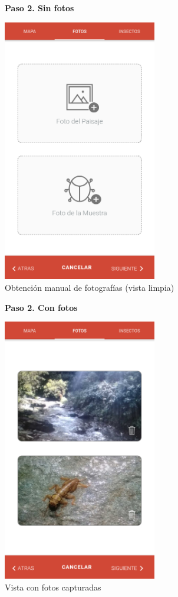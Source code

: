 				\begin{figure}[H]
					\centering
					\textbf{Paso 2. Sin fotos}\par\medskip
					\includegraphics[width=0.6\textwidth]{Screenshots/registroPaso2A.png}
					\caption{Obtención manual de fotografías (vista limpia)}
				\end{figure}
				
				\begin{figure}[H]
					\centering
					\textbf{Paso 2. Con fotos}\par\medskip
					\includegraphics[width=0.6\textwidth]{Screenshots/registroPaso2B.png}
					\caption{Vista con fotos capturadas}
				\end{figure}
				
